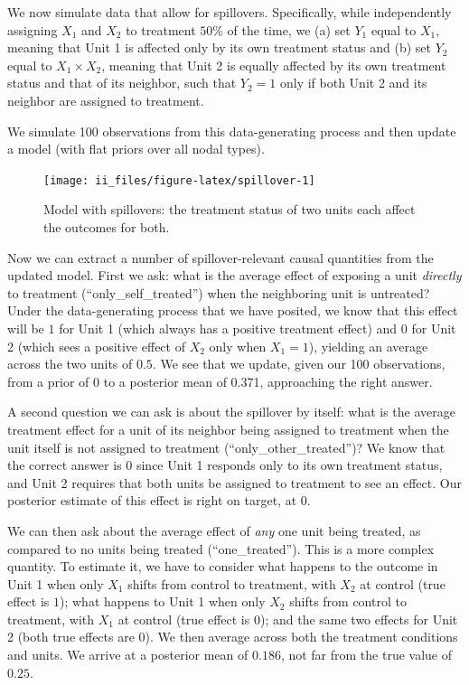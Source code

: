 \documentclass[
  12pt,
]{book}
\begin{document}
We now simulate data that allow for spillovers. Specifically, while independently assigning \(X_1\) and \(X_2\) to treatment \(50 \%\) of the time, we (a) set \(Y_1\) equal to \(X_1\), meaning that Unit 1 is affected only by its own treatment status and (b) set \(Y_2\) equal to \(X_1 \times X_2\), meaning that Unit 2 is equally affected by its own treatment status and that of its neighbor, such that \(Y_2 = 1\) only if both Unit 2 and its neighbor are assigned to treatment.

We simulate 100 observations from this data-generating process and then update a model (with flat priors over all nodal types).

\begin{figure}
\texttt{[image: ii\_files/figure-latex/spillover-1]} \caption{Model with spillovers: the treatment status of two units each affect the outcomes for both.}\label{fig:spillover}
\end{figure}

Now we can extract a number of spillover-relevant causal quantities from the updated model. First we ask: what is the average effect of exposing a unit \emph{directly} to treatment (``only\_self\_treated'') when the neighboring unit is untreated? Under the data-generating process that we have posited, we know that this effect will be \(1\) for Unit 1 (which always has a positive treatment effect) and \(0\) for Unit 2 (which sees a positive effect of \(X_2\) only when \(X_1 = 1\)), yielding an average across the two units of \(0.5\). We see that we update, given our 100 observations, from a prior of 0 to a posterior mean of 0.371, approaching the right answer.

A second question we can ask is about the spillover by itself: what is the average treatment effect for a unit of its neighbor being assigned to treatment when the unit itself is not assigned to treatment (``only\_other\_treated'')? We know that the correct answer is \(0\) since Unit 1 responds only to its own treatment status, and Unit 2 requires that both units be assigned to treatment to see an effect. Our posterior estimate of this effect is right on target, at 0.

We can then ask about the average effect of \emph{any} one unit being treated, as compared to no units being treated (``one\_treated''). This is a more complex quantity. To estimate it, we have to consider what happens to the outcome in Unit 1 when only \(X_1\) shifts from control to treatment, with \(X_2\) at control (true effect is \(1\)); what happens to Unit 1 when only \(X_2\) shifts from control to treatment, with \(X_1\) at control (true effect is \(0\)); and the same two effects for Unit 2 (both true effects are \(0\)). We then average across both the treatment conditions and units. We arrive at a posterior mean of \(0.186\), not far from the true value of \(0.25\).
\end{document}
